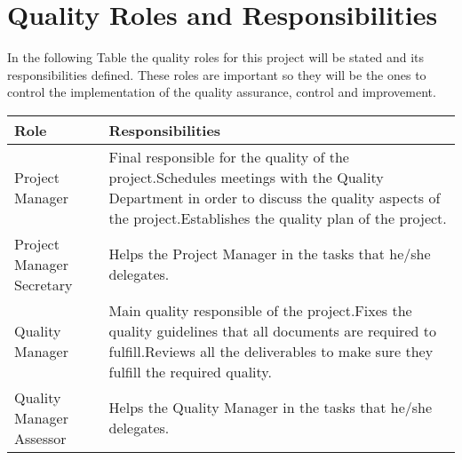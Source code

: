 \section{Quality Roles and Responsibilities}
In the following Table the quality roles for this project will be stated and its responsibilities defined. These roles are important so they will be the ones to control the implementation of the quality assurance, control and improvement.

\begin{longtable}[H]{>{\raggedright\arraybackslash}p{5cm} p{9cm}}
	
	\toprule[2pt]
	
	\textbf{Role} &  \textbf{Responsibilities}\\
	
	\midrule [1.5pt]
	\endhead
	
	Project Manager & Final responsible for the quality of the project.\vspace{0.3cm}\newline Schedules meetings with the Quality Department in order to discuss the quality aspects of the project.\vspace{0.3cm}\newline Establishes the quality plan of the project.\vspace{0.2cm} \\
	
	\midrule
		
	Project Manager Secretary & Helps the Project Manager in the tasks that he/she delegates.\vspace{0.2cm} \\
	
	\midrule
	
	Quality Manager & Main quality responsible of the project.\vspace{0.3cm}\newline Fixes the quality guidelines that all documents are required to fulfill.\vspace{0.3cm}\newline Reviews all the deliverables to make sure they fulfill the required quality.\vspace{0.2cm} \\

	\midrule
	
	Quality Manager Assessor & Helps the Quality Manager in the tasks that he/she delegates.\vspace{0.2cm} \\
	

\end{longtable}
